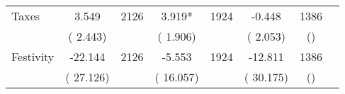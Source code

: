 \begin{tabular}{l*{6}{c}}
Taxes        &              3.549      &       2126       &              3.919*      &       1924       &             -0.448      &       1386  &  &              \\
                       &       (       2.443)            &                               &       (       1.906)            &                               &       (       2.053)            &       () &                  \\
Festivity        &            -22.144      &       2126       &             -5.553      &       1924       &            -12.811      &       1386  &  &              \\
                       &       (      27.126)            &                               &       (      16.057)            &                               &       (      30.175)            &       () &                  \\
\hline \end{tabular}